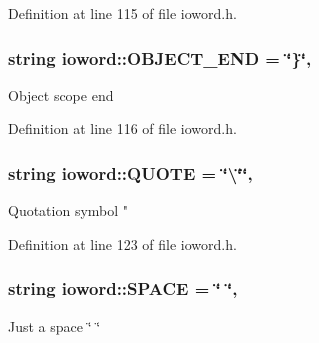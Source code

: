 Definition at line 115 of file ioword.\-h.

\hypertarget{classosea_1_1ofreq_1_1ioword_a794839618d39b9ba48cd43779b394f44}{
\subsubsection[{O\-B\-J\-E\-C\-T\-\_\-\-E\-N\-D}]{\setlength{\rightskip}{0pt plus 5cm}string ioword\-::\-O\-B\-J\-E\-C\-T\-\_\-\-E\-N\-D = \char`\"{}\}\char`\"{}\hspace{0.3cm}{\ttfamily [static]}, {\ttfamily [protected]}}}\label{classosea_1_1ofreq_1_1ioword_a794839618d39b9ba48cd43779b394f44}
Object scope end 

Definition at line 116 of file ioword.\-h.

\hypertarget{classosea_1_1ofreq_1_1ioword_a36a08500affa80665623032db7ca1eff}{
\subsubsection[{Q\-U\-O\-T\-E}]{\setlength{\rightskip}{0pt plus 5cm}string ioword\-::\-Q\-U\-O\-T\-E = \char`\"{}\textbackslash{}\char`\"{}\char`\"{}\hspace{0.3cm}{\ttfamily [static]}, {\ttfamily [protected]}}}\label{classosea_1_1ofreq_1_1ioword_a36a08500affa80665623032db7ca1eff}
Quotation symbol " 

Definition at line 123 of file ioword.\-h.

\hypertarget{classosea_1_1ofreq_1_1ioword_a54c428ab554e48d488643a794c7d5ec5}{
\subsubsection[{S\-P\-A\-C\-E}]{\setlength{\rightskip}{0pt plus 5cm}string ioword\-::\-S\-P\-A\-C\-E = \char`\"{} \char`\"{}\hspace{0.3cm}{\ttfamily [static]}, {\ttfamily [protected]}}}\label{classosea_1_1ofreq_1_1ioword_a54c428ab554e48d488643a794c7d5ec5}
Just a space \char`\"{} \char`\"{} 

